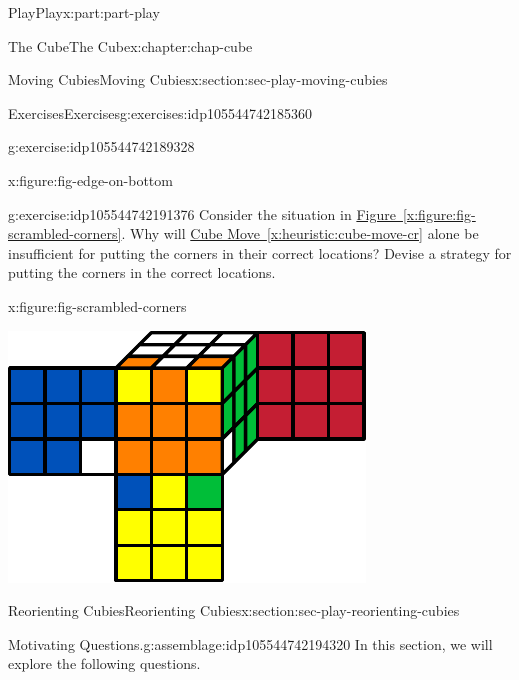 \documentclass[oneside,10pt,]{book}
\newcommand{\xreffont}{\relax}
\numberwithin{equation}{section}
\begin{document}
\begin{partptx}{Play}{}{Play}{}{}{x:part:part-play}
\begin{chapterptx}{The Cube}{}{The Cube}{}{}{x:chapter:chap-cube}
\begin{sectionptx}{Moving Cubies}{}{Moving Cubies}{}{}{x:section:sec-play-moving-cubies}
\begin{exercises-subsection-numberless}{Exercises}{}{Exercises}{}{}{g:exercises:idp105544742185360}
\begin{divisionexercise}{3}{}{}{g:exercise:idp105544742189328}
\begin{figureptx}{}{x:figure:fig-edge-on-bottom}{}
\begin{image}{0.25}{0.5}{0.25}
\end{image}%
\tcblower
\end{figureptx}%
\end{divisionexercise}%
\begin{divisionexercise}{4}{}{}{g:exercise:idp105544742191376}%
Consider the situation in \hyperref[x:figure:fig-scrambled-corners]{Figure~{\xreffont\ref{x:figure:fig-scrambled-corners}}}. Why will \hyperref[x:heuristic:cube-move-cr]{Cube Move~{\xreffont\ref{x:heuristic:cube-move-cr}}} alone be insufficient for putting the corners in their correct locations? Devise a strategy for putting the corners in the correct locations.%
\begin{figureptx}{}{x:figure:fig-scrambled-corners}{}%
\begin{image}{0.25}{0.5}{0.25}%
\includegraphics[width=\linewidth]{./images/scrambled_corners.pdf}
\end{image}%
\tcblower
\end{figureptx}%
\end{divisionexercise}%
\end{exercises-subsection-numberless}
\end{sectionptx}
%
%
\typeout{************************************************}
\typeout{************************************************}
%
\begin{sectionptx}{Reorienting Cubies}{}{Reorienting Cubies}{}{}{x:section:sec-play-reorienting-cubies}
\begin{assemblage}{Motivating Questions.}{g:assemblage:idp105544742194320}%
In this section, we will explore the following questions. %
\begin{enumerate}

\end{enumerate}
\end{assemblage}
\end{sectionptx}
\end{chapterptx}
\end{partptx}
\end{document}
